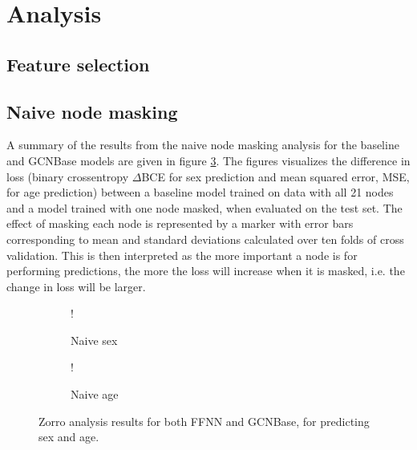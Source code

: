 

\section{Analysis}
\subsection{Feature selection}
\subsection{Naive node masking}

A summary of the results from the naive node masking analysis for the baseline and GCNBase models are given in figure \ref{fig:naive_results}. The figures visualizes the difference in loss (binary crossentropy $\Delta$BCE for sex prediction and mean squared error, MSE, for age prediction) between a baseline model trained on data with all 21 nodes and a model trained with one node masked, when evaluated on the test set. The effect of masking each node is represented by a marker with error bars corresponding to mean and standard deviations calculated over ten folds of cross validation. This is then interpreted as the more important a node is for performing predictions, the more the loss will increase when it is masked, i.e. the change in loss will be larger.

\begin{figure}[H]
    \centering
        \begin{subfigure}{.5\textwidth}
            \centering
            \begin{center}
                 {!} {
                    
                }
            \end{center}
            \caption{Naive sex}
            \label{fig:naive_results_sex}
        \end{subfigure}%
        \begin{subfigure}{.5\textwidth}
            \centering
            \begin{center}
                 {!} {
                    
                }
            \end{center}
            \caption{Naive age}
            \label{fig:naive_results_age}
        \end{subfigure}
    \caption{Zorro analysis results for both FFNN and GCNBase, for predicting sex and age.}
    \label{fig:naive_results}
\end{figure}


